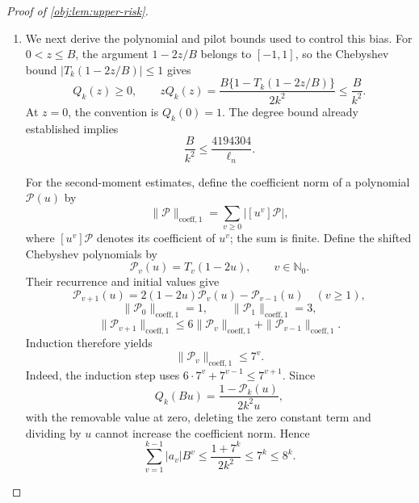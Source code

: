 \documentclass[11pt]{article}
\begin{document}
\begin{proof}[Proof of \cref{obj:lem:upper-risk}]
\begin{enumerate}
For integers \(v\ge1\), use the falling factorial
\[
(C_j^\star)_v=\prod_{t=0}^{v-1}(C_j^\star-t).
\]
Conditional expectation of \(U_j^\star\), followed by the Poisson factorial-moment identity, gives
\[
\begin{aligned}
\mathbb E_\star[
(U_j^\star-C_j^\star/2)(C_j^\star-1)_{v-1}]
&=\eta_j\mathbb E_\star[(C_j^\star)_v]\\
&=\eta_j\zeta_j^v.
\end{aligned}
\]
Thus the coefficient identity in \cref{obj:def:mm-estimator} yields
\[
\mathbb E_\star[H_j^\star]
=\eta_j\{1-Q_k(\zeta_j)\}.
\]
Similarly, conditioning on \(C_j^\star>0\) gives
\[
\mathbb E_\star[D_j^\star]
=\eta_j\Pr_\star(C_j^\star>0)
=\eta_j(1-e^{-\zeta_j}).
\]
Independence of the pilot stream from the fourth stream now implies
\[
\mathbb E_\star[G_j^\star]-\eta_j
=-\eta_j\{\wp_jQ_k(\zeta_j)+(1-\wp_j)e^{-\zeta_j}\}.
\]
The first-stream mean and independence of the second stream from the pilot and fourth streams also give
\[
\mathbb E_\star[\tau_{\mathrm{lin}}]
=2\sum_{j\in\mathcal J}\epsilon_jt_j\eta_j,
\qquad
\mathbb E_\star[V_j^\star G_j^\star]
=w_j\mathbb E_\star[G_j^\star].
\]
Combining these identities with the cell decomposition of the target,
\[
\mathbb E_\star[\tau_{\mathrm{raw}}]-\tau(P)
=
2\sum_{j\in\mathcal J}
\epsilon_jw_j\{\mathbb E_\star[G_j^\star]-\eta_j\}.
\]

\item We next derive the polynomial and pilot bounds used to control this bias. For \(0<z\le B\), the argument \(1-2z/B\) belongs to \([-1,1]\), so the Chebyshev bound \(|T_k(1-2z/B)|\le1\) gives
\[
Q_k(z)\ge0,
\qquad
zQ_k(z)
=\frac{B\{1-T_k(1-2z/B)\}}{2k^2}
\le\frac{B}{k^2}.
\]
At \(z=0\), the convention is \(Q_k(0)=1\).
The degree bound already established implies
\[
\frac{B}{k^2}
\le\frac{4194304}{\ell_n}.
\]

For the second-moment estimates, define the coefficient norm of a polynomial
\(\mathcal P(u)\) by
\[
\|\mathcal P\|_{\mathrm{coeff},1}
=\sum_{v\ge0}|[u^v]\mathcal P|,
\]
where \([u^v]\mathcal P\) denotes its coefficient of \(u^v\); the sum is finite. Define the shifted Chebyshev polynomials by
\[
\mathcal P_v(u)=T_v(1-2u),
\qquad v\in\mathbb N_0.
\]
Their recurrence and initial values give
\[
\mathcal P_{v+1}(u)
=2(1-2u)\mathcal P_v(u)-\mathcal P_{v-1}(u)
\quad(v\ge1),
\]
\[
\|\mathcal P_0\|_{\mathrm{coeff},1}=1,
\qquad
\|\mathcal P_1\|_{\mathrm{coeff},1}=3,
\]
\[
\|\mathcal P_{v+1}\|_{\mathrm{coeff},1}
\le6\|\mathcal P_v\|_{\mathrm{coeff},1}
+\|\mathcal P_{v-1}\|_{\mathrm{coeff},1}.
\]
Induction therefore yields
\[
\|\mathcal P_v\|_{\mathrm{coeff},1}\le7^v.
\]
Indeed, the induction step uses
\(6\cdot7^v+7^{v-1}\le7^{v+1}\).
Since
\[
Q_k(Bu)=\frac{1-\mathcal P_k(u)}{2k^2u},
\]
with the removable value at zero, deleting the zero constant term and dividing by \(u\) cannot increase the coefficient norm. Hence
\[
\sum_{v=1}^{k-1}|a_v|B^v
\le\frac{1+7^k}{2k^2}
\le7^k
\le8^k.
\]


\end{enumerate}
\end{proof}
\end{document}
